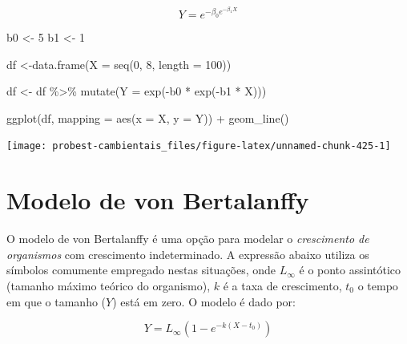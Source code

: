 \documentclass[
]{book}
\newenvironment{Shaded}{\begin{snugshade}}{\end{snugshade}}
\newcommand{\AttributeTok}[1]{\textcolor[rgb]{0.77,0.63,0.00}{#1}}
\newcommand{\DecValTok}[1]{\textcolor[rgb]{0.00,0.00,0.81}{#1}}
\newcommand{\FunctionTok}[1]{\textcolor[rgb]{0.00,0.00,0.00}{#1}}
\newcommand{\NormalTok}[1]{#1}
\newcommand{\OtherTok}[1]{\textcolor[rgb]{0.56,0.35,0.01}{#1}}
\newcommand{\SpecialCharTok}[1]{\textcolor[rgb]{0.00,0.00,0.00}{#1}}
\begin{document}
\[Y = e^{-\beta_0 e^{-\beta_1 X}}\]

\begin{Shaded}
\begin{Highlighting}[]
\NormalTok{b0 }\OtherTok{\textless{}{-}} \DecValTok{5}
\NormalTok{b1 }\OtherTok{\textless{}{-}} \DecValTok{1}

\NormalTok{df }\OtherTok{\textless{}{-}}\FunctionTok{data.frame}\NormalTok{(}\AttributeTok{X =} \FunctionTok{seq}\NormalTok{(}\DecValTok{0}\NormalTok{, }\DecValTok{8}\NormalTok{, }\AttributeTok{length =} \DecValTok{100}\NormalTok{))}

\NormalTok{df }\OtherTok{\textless{}{-}}\NormalTok{ df }\SpecialCharTok{\%\textgreater{}\%} \FunctionTok{mutate}\NormalTok{(}\AttributeTok{Y =} \FunctionTok{exp}\NormalTok{(}\SpecialCharTok{{-}}\NormalTok{b0 }\SpecialCharTok{*} \FunctionTok{exp}\NormalTok{(}\SpecialCharTok{{-}}\NormalTok{b1 }\SpecialCharTok{*}\NormalTok{ X)))}

\FunctionTok{ggplot}\NormalTok{(df, }\AttributeTok{mapping =} \FunctionTok{aes}\NormalTok{(}\AttributeTok{x =}\NormalTok{ X, }\AttributeTok{y =}\NormalTok{ Y)) }\SpecialCharTok{+}
  \FunctionTok{geom\_line}\NormalTok{()}
\end{Highlighting}
\end{Shaded}

\begin{center}\texttt{[image: probest-cambientais\_files/figure-latex/unnamed-chunk-425-1]} \end{center}

\hypertarget{modelo-de-von-bertalanffy}{%
\section{Modelo de von Bertalanffy}\label{modelo-de-von-bertalanffy}}

O modelo de von Bertalanffy é uma opção para modelar o \emph{crescimento de organismos} com crescimento indeterminado. A expressão abaixo utiliza os símbolos comumente empregado nestas situações, onde \(L_{\infty}\) é o ponto assintótico (tamanho máximo teórico do organismo), \(k\) é a taxa de crescimento, \(t_0\) o tempo em que o tamanho (\(Y\)) está em zero. O modelo é dado por:

\[Y = L_{\infty} (1 - e^{-k(X - t_0)})\]
\end{document}
